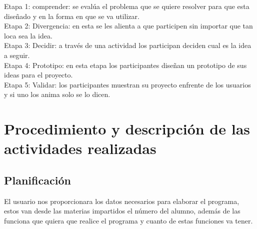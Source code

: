 \documentclass[letterpaper,oneside,openany,11pt]{book}
\begin{document}
Etapa 1: comprender: se evalúa el problema que se quiere resolver para que esta diseñado y en la forma en que se va utilizar.\\
Etapa 2: Divergencia: en esta se les alienta a que participen sin importar que tan loca sea la idea.\\
Etapa 3: Decidir: a través de una actividad los participan deciden cual es la idea a seguir.\\
Etapa 4: Prototipo: en esta etapa los participantes diseñan un prototipo de sus ideas para el proyecto.\\
Etapa 5: Validar: los participantes muestran su proyecto enfrente de los usuarios y si uno los anima solo se lo dicen.\\






\chapter{Procedimiento y descripción de las actividades realizadas}\label{cap.procedimiento}
\section{Planificación}
\noindent El usuario nos proporcionara los datos necesarios para elaborar el programa, estos van desde las materias impartidos el número del alumno, además de las funciona que quiera que realice el programa y cuanto de estas funciones va tener.\\ 
\end{document}
